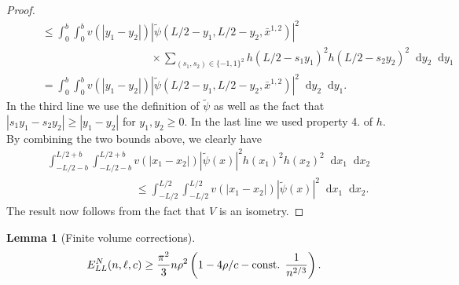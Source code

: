 \documentclass[a4paper,11pt]{article}
\newcommand{\abs}[1]{\left\lvert #1 \right\rvert}
\newcommand*\diff{\mathop{}\!\mathrm{d}}
\newtheorem{lemma}[theorem]{Lemma}
\numberwithin{equation}{section}
\begin{document}
\begin{proof}
\begin{equation}
\begin{aligned}
		&\quad\quad\leq \int_{0}^{b}\int_{0}^{b}v(\abs{y_1-y_2})\abs{\tilde{\psi}(L/2-y_1,L/2- y_2,\bar{x}^{1,2})}^2\\&\hspace{5cm}\times\sum_{(s_1,s_2)\in\{-1,1\}^2}h(L/2-s_1 y_1)^2h(L/2-s_2 y_2)^2\diff y_2\diff y_1\\
		&\quad\quad=\int_{0}^{b}\int_{0}^{b}v(\abs{y_1-y_2})\abs{\tilde{\psi}(L/2-y_1,L/2- y_2,\bar{x}^{1,2})}^2\diff y_2\diff y_1.
		\end{aligned}
		\end{equation}
		In the third line we use the definition of $ \tilde{\psi} $ as well as the fact that $ \abs{s_1y_1-s_2y_2}\geq \abs{y_1-y_2} $ for $ y_1,y_2\geq 0 $. In the last line we used property 4. of $ h $.
		By combining the two bounds above, we clearly have 
		\begin{equation}
		\begin{aligned}
		&\int_{-L/2-b}^{L/2+b}\int_{-L/2-b}^{L/2+b}v(\abs{x_1-x_2})\abs{\tilde{\psi}(x)}^2h(x_1)^2h(x_2)^2\diff x_1\diff x_2\\&\qquad\qquad\qquad\qquad \leq \int_{-L/2}^{L/2}\int_{-L/2}^{L/2}v(\abs{x_1-x_2})\abs{\tilde{\psi}(x)}^2\diff x_1\diff x_2.
		\end{aligned}
		\end{equation}
		 The result now follows from the fact that $ V $ is an isometry.
	\end{proof}
	\begin{lemma}[Finite volume corrections]\label{LemmaLiebLinigerNeumannLowerBound}
		\begin{equation}
		E_{LL}^{N}(n,\ell,c)\geq \frac{\pi^2}{3}n\rho^2\left(1-4\rho/c-\textnormal{const. }\frac{1}{n^{2/3}}\right).
		\end{equation}
	\end{lemma}
\end{document}
